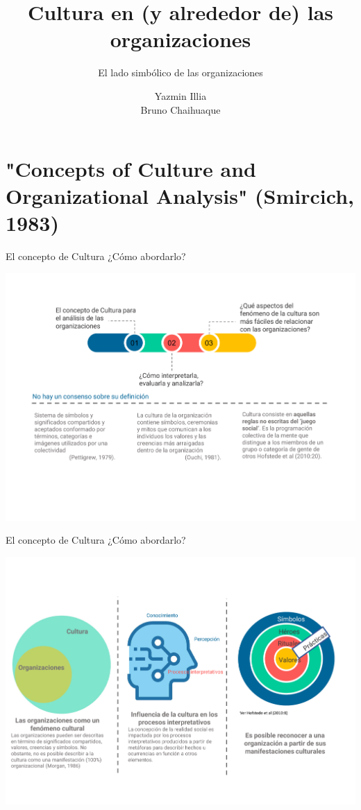 \documentclass[aspectratio=169]{beamer}
\title{Cultura en (y alrededor de)  las organizaciones }
\subtitle{El lado simbólico de las organizaciones}
\author{Yazmin Illia \\ Bruno Chaihuaque\orcidlink{0000-0001-5982-8505}}
\begin{document}
	
	
	\section{"Concepts of Culture and Organizational Analysis" (Smircich, 1983)}
	\begin{frame}{El concepto de Cultura ¿Cómo abordarlo?}
		\begin{center}
			\includegraphics[height=\textheight]{./figures/L1.pdf}
		\end{center}
		
	\end{frame}
	\begin{frame}{El concepto de Cultura ¿Cómo abordarlo?}
		\begin{center}
			\includegraphics[height=\textheight]{./figures/L2.pdf}
		\end{center}
	\end{frame}
	
\end{document}
